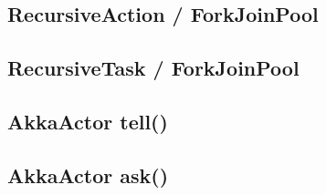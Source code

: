 \newpage
\subsection{RecursiveAction / ForkJoinPool}
\label{javaRunnable}


\newpage
\subsection{RecursiveTask / ForkJoinPool}
\label{javaRunnable}


\subsection{AkkaActor tell()}
\label{javaRunnable}


\newpage
\subsection{AkkaActor ask()}
\label{javaRunnable}

